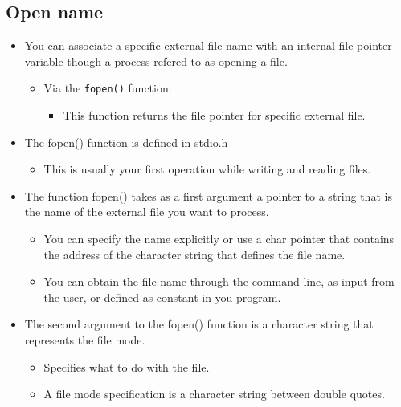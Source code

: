 \subsection{Open name}
\begin{itemize}
    \item You can associate a specific external file name with an internal file pointer variable though a process refered to as opening a file.
        \begin{itemize}
            \item Via the \texttt{fopen()} function:
                \begin{itemize}
                    \item This function returns the file pointer for specific external file.
                \end{itemize}
            \end{itemize}
    
    \item The fopen() function is defined in stdio.h
        \begin{itemize}
            \item This is usually your first operation while writing and reading files.
        \end{itemize}
    
    \item The function fopen() takes as a first argument a pointer to a string that is the name of the external file you want to process.
        \begin{itemize}
            \item You can specify the name explicitly or use a char pointer that contains the address of the character string that defines the file name. 
            \item You can obtain the file name through the command line, as input from the user, or defined as constant in you program.
        \end{itemize}
    
    \item The second argument to the fopen() function is a character string that represents the file mode.
        \begin{itemize}
            \item Specifies what to do with the file.
            \item A file mode specification is a character string between double quotes.     
        \end{itemize}
    

\end{itemize}
